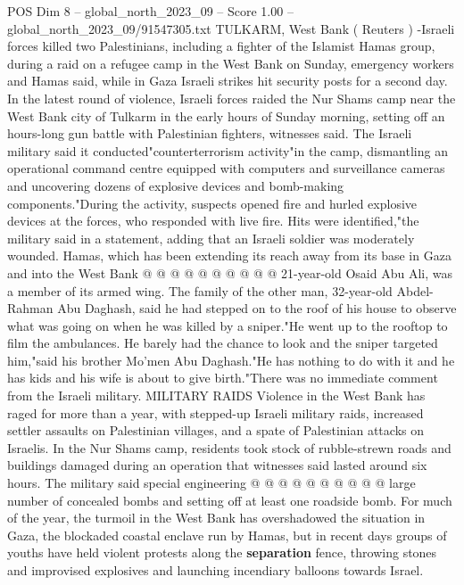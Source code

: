 \begin{textsample}{POS Dim 8 – global\_north\_2023\_09 – Score 1.00 – global\_north\_2023\_09/91547305.txt}  \label{ex:f8_pos_129}
TULKARM, West Bank ( Reuters ) -Israeli forces killed two Palestinians, including a fighter of the Islamist Hamas group, during a raid on a refugee camp in the West Bank on Sunday, emergency workers and Hamas said, while in Gaza Israeli strikes hit security posts for a second day.
In the latest round of violence, Israeli forces raided the Nur Shams camp near the West Bank city of Tulkarm in the early hours of Sunday morning, setting off an hours-long gun battle with Palestinian fighters, witnesses said.
The Israeli military said it conducted"counterterrorism activity"in the camp, dismantling an operational command centre equipped with computers and surveillance cameras and uncovering dozens of explosive devices and bomb-making components."During the activity, suspects opened fire and hurled explosive devices at the forces, who responded with live fire.
Hits were identified,"the military said in a statement, adding that an Israeli soldier was moderately wounded.
Hamas, which has been extending its reach away from its base in Gaza and into the West Bank @ @ @ @ @ @ @ @ @ @ 21-year-old Osaid Abu Ali, was a member of its armed wing.
The family of the other man, 32-year-old Abdel-Rahman Abu Daghash, said he had stepped on to the roof of his house to observe what was going on when he was killed by a sniper."He went up to the rooftop to film the ambulances.
He barely had the chance to look and the sniper targeted him,"said his brother Mo'men Abu Daghash."He has nothing to do with it and he has kids and his wife is about to give birth."There was no immediate comment from the Israeli military.
MILITARY RAIDS Violence in the West Bank has raged for more than a year, with stepped-up Israeli military raids, increased settler assaults on Palestinian villages, and a spate of Palestinian attacks on Israelis.
In the Nur Shams camp, residents took stock of rubble-strewn roads and buildings damaged during an operation that witnesses said lasted around six hours.
The military said special engineering @ @ @ @ @ @ @ @ @ @ large number of concealed bombs and setting off at least one roadside bomb.
For much of the year, the turmoil in the West Bank has overshadowed the situation in Gaza, the blockaded coastal enclave run by Hamas, but in recent days groups of youths have held violent protests along the \textbf{separation} fence, throwing stones and improvised explosives and launching incendiary balloons towards Israel.

\end{textsample}
